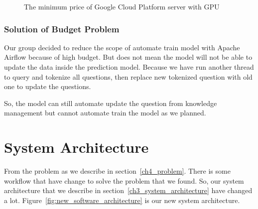 \documentclass[12pt,oneside,openright,a4paper]{cpe-english-project}
\begin{document}
\begin{figure}[!h]\centering
{}
\caption{The minimum price of Google Cloud Platform server with GPU}
\label{fig:model_pattern3}
\end{figure}

\subsubsection{Solution of Budget Problem}
Our group decided to reduce the scope of automate train model with Apache Airflow because of high budget.
But does not mean the model will not be able to update the data inside the prediction model.
Because we have run another thread to query and tokenize all questions,
then replace new tokenized question with old one to update the questions.

So, the model can still automate update the question from knowledge management
but cannot automate train the model as we planned.

\pagebreak
\section{System Architecture}
From the problem as we describe in section~\ref*{ch4_problem}.
There is some workflow that have change to solve the problem that we found.
So, our system architecture that we describe in section~\ref*{ch3_system_architecture} have changed a lot.
Figure~\ref*{fig:new_software_architecture} is our new system architecture.
\end{document}
